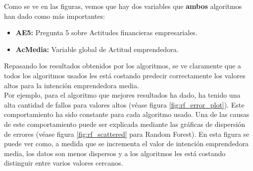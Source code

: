 Como se ve en las figuras, vemos que hay dos variables que \textbf{ambos} algoritmos han dado como más importantes: 
\begin{itemize}
	\item\textbf{AE5:} Pregunta  5 sobre Actitudes financieras empresariales.
	\item\textbf{AcMedia:} Variable global de Actitud emprendedora.
\end{itemize}
Repasando los resultados obtenidos por los algoritmos, se ve claramente que a todos los algoritmos usados les está costando predecir correctamente los valores altos para la intención emprendedora media.
 \\
\linebreak
Por ejemplo, para el algoritmo que mejores resultados ha dado, ha tenido una alta cantidad de fallos para  valores altos (véase figura \ref{fig:rf_error_plot}). Este comportamiento ha sido constante para cada algoritmo usado. Una de las causas de este comportamiento puede ser explicada mediante las gráficas de dispersión de errores (véase figura \ref{fig:rf_scattered} para Random Forest). En esta figura se puede ver como, a medida que se incrementa el valor de intención emprendedora media, los datos son menos dispersos y a los algoritmos les está costando distinguir entre varios valores cercanos. 

